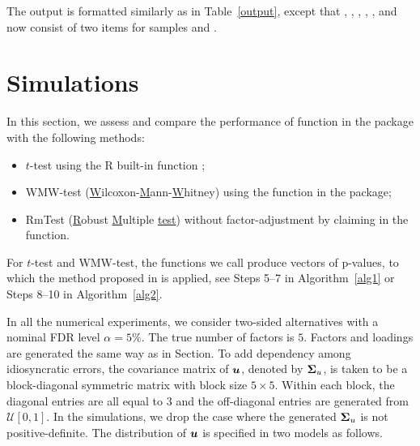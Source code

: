 The output is formatted similarly as in Table~\ref{output}, except that , , , , ,  and  now consist of two items for samples  and . %







\section[Simulations]{Simulations}
\label{sec:testing}

In this section, we assess and compare the performance of  function in the  package with the following methods:
\begin{itemize}
\item $t$-test using the R built-in function ;
\item WMW-test  (\underline{W}ilcoxon-\underline{M}ann-\underline{W}hitney) using the  function in the  package;
\item RmTest (\underline{R}obust \underline{M}ultiple \underline{test}) without factor-adjustment by claiming  in the  function.
\end{itemize}

For $t$-test and WMW-test, the functions we call produce vectors of p-values, to which the method proposed in \cite{S2002} is applied, see Steps 5--7 in Algorithm~\ref{alg1} or Steps 8--10 in Algorithm~\ref{alg2}.


In all the numerical experiments, we consider two-sided alternatives with a nominal FDR level $\%$. The true number of factors is  $5$. Factors and loadings are generated the same way as in  Section.
To add dependency among idiosyncratic errors, the covariance matrix of $\bm{u}$, denoted by $\bm{\Sigma}_u$, is taken to be a block-diagonal symmetric matrix with block size  $5 $. Within each block, the diagonal entries are all equal to $3$ and the off-diagonal entries are generated from $[0,1]$. {In the simulations, we drop the case where the generated $\bm{\Sigma}_u$ is not positive-definite.}
The distribution of $\bm{u}$ is specified in two models as follows.

